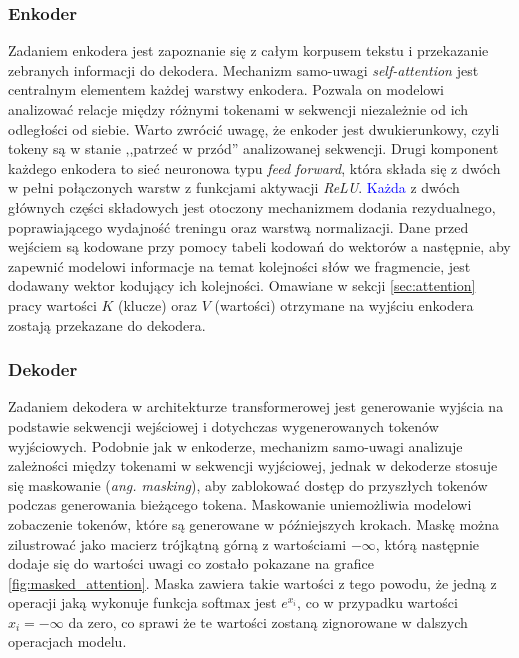 \documentclass[data-science]{agh-wi} %
\begin{document}
\subsubsection*{Enkoder}
Zadaniem enkodera jest zapoznanie się z całym korpusem tekstu i przekazanie zebranych informacji do dekodera. Mechanizm samo-uwagi \textit{self-attention} jest centralnym elementem każdej warstwy enkodera. Pozwala on modelowi analizować relacje między różnymi tokenami w sekwencji niezależnie od ich odległości od siebie. Warto zwrócić uwagę, że enkoder jest dwukierunkowy, czyli tokeny są w stanie ,,patrzeć w przód'' analizowanej sekwencji. Drugi komponent każdego enkodera to sieć neuronowa typu \textit{feed forward}, która składa się z dwóch w pełni połączonych warstw z funkcjami aktywacji \textit{ReLU}. \textcolor{blue}{Każda} z dwóch głównych części składowych jest otoczony mechanizmem dodania rezydualnego, poprawiającego wydajność treningu oraz warstwą normalizacji. Dane przed wejściem są kodowane przy pomocy tabeli kodowań do wektorów a następnie, aby zapewnić modelowi informacje na temat kolejności słów we fragmencie, jest dodawany wektor kodujący ich kolejności. Omawiane w sekcji \ref*{sec:attention} pracy wartości $K$ (klucze) oraz $V$ (wartości) otrzymane na wyjściu enkodera zostają przekazane do dekodera.

\subsubsection*{Dekoder}
Zadaniem dekodera w architekturze transformerowej jest generowanie wyjścia na podstawie sekwencji wejściowej i dotychczas wygenerowanych tokenów wyjściowych. Podobnie jak w enkoderze, mechanizm samo-uwagi analizuje zależności między tokenami w sekwencji wyjściowej, jednak w dekoderze stosuje się maskowanie (\textit{ang. masking}), aby zablokować dostęp do przyszłych tokenów podczas generowania bieżącego tokena. Maskowanie uniemożliwia modelowi zobaczenie tokenów, które są generowane w późniejszych krokach. Maskę można zilustrować jako macierz trójkątną górną z wartościami $-\infty$, którą następnie dodaje się do wartości uwagi co zostało pokazane na grafice \ref*{fig:masked_attention}. Maska zawiera takie wartości z tego powodu, że jedną z operacji jaką wykonuje funkcja softmax jest $e^{x_i}$, co w przypadku wartości $x_i = -\infty$ da zero, co sprawi że te wartości zostaną zignorowane w dalszych operacjach modelu.
\end{document}
